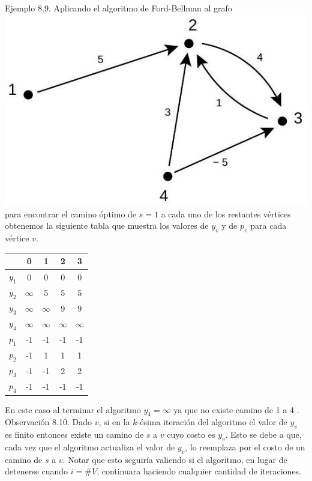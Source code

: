 \documentclass[10pt]{article}
\begin{document}
Ejemplo 8.9. Aplicando el algoritmo de Ford-Bellman al grafo\\
\includegraphics[max width=\textwidth, center]{2025_09_05_93c7c1835f249f70c0eeg-36}\\
para encontrar el camino óptimo de $s=1$ a cada uno de los restantes vértices obtenemos la siguiente tabla que muestra los valores de $y_{v}$ y de $p_{v}$ para cada vértice $v$.

\begin{center}
\begin{tabular}{|c|c|c|c|c|}
\hline
 & 0 & 1 & 2 & 3 \\
\hline
$y_{1}$ & 0 & 0 & 0 & 0 \\
\hline
$y_{2}$ & $\infty$ & 5 & 5 & 5 \\
\hline
$y_{3}$ & $\infty$ & $\infty$ & 9 & 9 \\
\hline
$y_{4}$ & $\infty$ & $\infty$ & $\infty$ & $\infty$ \\
\hline
$p_{1}$ & -1 & -1 & -1 & -1 \\
\hline
$p_{2}$ & -1 & 1 & 1 & 1 \\
\hline
$p_{3}$ & -1 & -1 & 2 & 2 \\
\hline
$p_{4}$ & -1 & -1 & -1 & -1 \\
\hline
\end{tabular}
\end{center}

En este caso al terminar el algoritmo $y_{4}=\infty$ ya que no existe camino de 1 a 4 .\\
Observación 8.10. Dado $v$, si en la $k$-ésima iteración del algoritmo el valor de $y_{v}$ es finito entonces existe un camino de $s$ a $v$ cuyo costo es $y_{v}$. Esto se debe a que, cada vez que el algoritmo actualiza el valor de $y_{v}$, lo reemplaza por el costo de un camino de $s$ a $v$. Notar que esto seguiría valiendo si el algoritmo, en lugar de detenerse cuando $i=\# V$, continuara haciendo cualquier cantidad de iteraciones.
\end{document}

